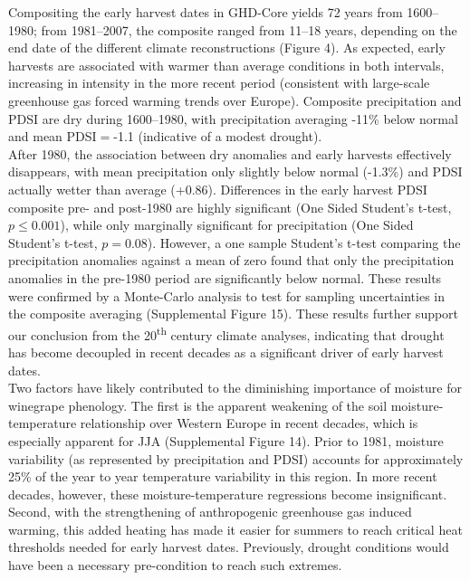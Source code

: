 \documentclass[final]{nature}
\begin{document}
\indent Compositing the early harvest dates in GHD-Core yields 72 years from 1600--1980; from 1981--2007, the composite ranged from 11--18 years, depending on the end date of the different climate reconstructions (Figure 4). As expected, early harvests are associated with warmer than average conditions in both intervals, increasing in intensity in the more recent period (consistent with large-scale greenhouse gas forced warming trends over Europe). Composite precipitation and PDSI are dry during 1600--1980, with precipitation averaging -11\% below normal and mean PDSI$=$-1.1 (indicative of a modest drought).\\
\indent After 1980, the association between dry anomalies and early harvests effectively disappears, with mean precipitation only slightly below normal (-1.3\%) and PDSI actually wetter than average (+0.86). Differences in the early harvest PDSI composite pre- and post-1980 are highly significant (One Sided Student's t-test, $p\le0.001$), while only marginally significant for precipitation (One Sided Student's t-test, $p=0.08$). However, a one sample Student's t-test comparing the precipitation anomalies against a mean of zero found that only the precipitation anomalies in the pre-1980 period are significantly below normal. These results were confirmed by a Monte-Carlo analysis to test for sampling uncertainties in the composite averaging (Supplemental Figure 15). These results further support our conclusion from the 20\textsuperscript{th} century climate analyses, indicating that drought has become decoupled in recent decades as a significant driver of early harvest dates.\\
\indent Two factors have likely contributed to the diminishing importance of moisture for winegrape phenology. The first is the apparent weakening of the soil moisture-temperature relationship over Western Europe in recent decades, which is especially apparent for JJA (Supplemental Figure 14). Prior to 1981, moisture variability (as represented by precipitation and PDSI) accounts for approximately 25\% of the year to year temperature variability in this region. In more recent decades, however, these moisture-temperature regressions become insignificant. Second, with the strengthening of anthropogenic greenhouse gas induced warming, this added heating has made it easier for summers to reach critical heat thresholds needed for early harvest dates. Previously, drought conditions would have been a necessary pre-condition to reach such extremes.\\
\end{document}

